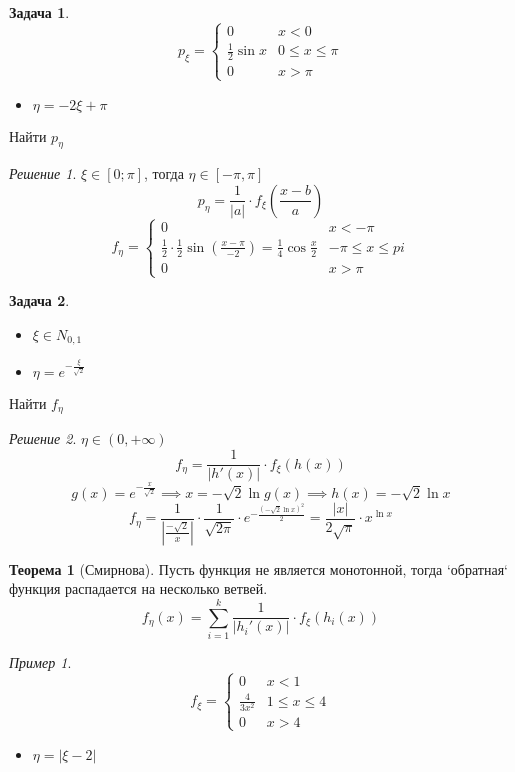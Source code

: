 \documentclass[english]{article}
\theoremstyle{plain}
\theoremstyle{remark}
\newtheorem*{solution}{Решение}
\newtheorem*{examp}{Пример}
\theoremstyle{definition}
\newtheorem{task}{Задача}
\newtheorem{theorem}{Теорема}[section]
\begin{document}
\begin{task}
\[ p_\xi = \begin{cases}
0 & x < 0 \\
\frac{1}{2} \sin x & 0 \le x \le \pi \\
0 & x > \pi
\end{cases}\]
\begin{itemize}
\item \(\eta = -2\xi + \pi\)
\end{itemize}
Найти \(p_\eta\)
\end{task}
\begin{solution}
\(\xi \in [0; \pi]\), тогда \(\eta \in [-\pi, \pi]\)
\[ p_\eta = \frac{1}{|a|}\cdot f_\xi \left(\frac{x - b}{a}\right) \]
\[ f_\eta = \begin{cases}
0 & x < -\pi \\
\frac{1}{2}\cdot\frac{1}{2}\sin \left(\frac{x - \pi}{-2}\right) = \frac{1}{4}\cos\frac{x}{2} & -\pi \le x \le pi \\
0 & x > \pi
\end{cases} \]
\end{solution}
\begin{task}
\-
\begin{itemize}
\item \(\xi \in N_{0, 1}\)
\item \(\eta = e^{-\frac{\xi}{\sqrt{2}}}\)
\end{itemize}
Найти \(f_\eta\)
\end{task}
\begin{solution}
\(\eta \in (0, +\infty)\)
\[ f_\eta = \frac{1}{|h'(x)|}\cdot f_\xi(h(x)) \]
\[ g(x) = e^{-\frac{x}{\sqrt{2}}} \implies x = -\sqrt{2}\ln g(x) \implies h(x) = -\sqrt{2}\ln x\]
\[ f_\eta = \frac{1}{\left|\frac{-\sqrt{2}}{x}\right|}\cdot \frac{1}{\sqrt{2\pi}}\cdot e^{\textstyle-\frac{(-\sqrt{2}\ln x)^2}{2}} = \frac{|x|}{2\sqrt{\pi}}\cdot x^{\ln x} \]
\end{solution}
\begin{theorem}[Смирнова]
Пусть функция не является монотонной, тогда `обратная` функция распадается на несколько ветвей.
\[ f_\eta(x) = \sum_{i = 1}^k \frac{1}{|h_i'(x)|} \cdot f_\xi(h_i(x)) \]
\end{theorem}
\begin{examp}
\[ f_\xi = \begin{cases}
0 & x < 1 \\
\frac{4}{3x^2} & 1 \le x \le 4 \\
0 & x > 4
\end{cases}\]
\begin{itemize}
\item \(\eta = |\xi - 2|\)
\end{itemize}
\end{examp}
\end{document}
